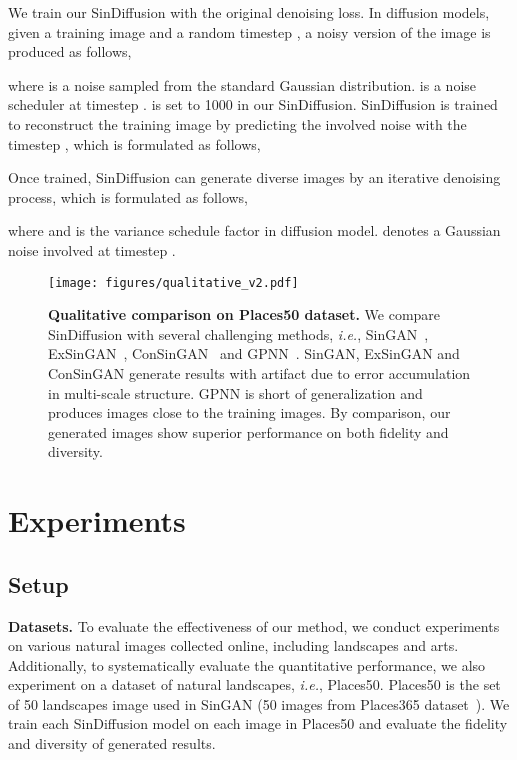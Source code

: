 \documentclass[10pt,twocolumn,letterpaper]{article}
\begin{document}
We train our SinDiffusion with the original denoising loss.
In diffusion models, given a training image  and a random timestep , a noisy version of the image  is produced as follows,

where  is a noise sampled from the standard Gaussian distribution.
 is a noise scheduler at timestep .
 is set to 1000 in our SinDiffusion.
SinDiffusion is trained to reconstruct the training image  by predicting the involved noise  with the timestep , which is formulated as follows,

Once trained, SinDiffusion can generate diverse images by an iterative denoising process, which is formulated as follows,

where  and  is the variance schedule factor in diffusion model.
 denotes a Gaussian noise involved at timestep .

\begin{figure*}[t]
  \centering
   \texttt{[image: figures/qualitative\_v2.pdf]}
   \vspace{-7mm}
   \caption{
   \textbf{Qualitative comparison on Places50 dataset.}
   We compare SinDiffusion with several challenging methods, \emph{i.e.}, SinGAN~\cite{shaham2019singan}, ExSinGAN~\cite{zhang2021exsingan}, ConSinGAN~\cite{hinz2021improved} and GPNN~\cite{granot2022drop}.
   SinGAN, ExSinGAN and ConSinGAN generate results with artifact due to error accumulation in multi-scale structure.
   GPNN is short of generalization and produces images close to the training images.
   By comparison, our generated images show superior performance on both fidelity and diversity.
   }
   \vspace{-6mm}
   \label{fig:qualitative}
\end{figure*}

\section{Experiments}
\label{sec:formatting}
\subsection{Setup}
\noindent \textbf{Datasets.} 
To evaluate the effectiveness of our method, we conduct experiments on various natural images collected online, including landscapes and arts.
Additionally, to systematically evaluate the quantitative performance, we also experiment on a dataset of natural landscapes, \emph{i.e.}, Places50.
Places50 is the set of 50 landscapes image used in SinGAN (50 images from Places365 dataset~\cite{zhou2018places}).
We train each SinDiffusion model on each image in Places50 and evaluate the fidelity and diversity of generated results.
\end{document}
